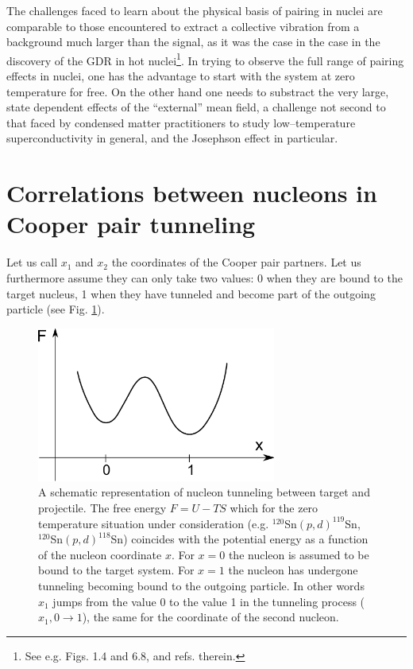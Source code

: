 The challenges faced to learn about the physical basis of pairing in nuclei are comparable to those encountered to extract a   collective vibration from a background much larger than the signal, as it was the case in the case in the discovery of the GDR in hot nuclei\footnote{See e.g. \cite{Bortignon:98} Figs. 1.4 and 6.8, and refs. therein.}. In trying to observe the full range of pairing effects in nuclei, one has the advantage to start with the system at zero temperature for free. On the other hand one needs to substract the very large, state dependent effects of the ``external'' mean field, a challenge not second to that faced by condensed matter practitioners to study low--temperature superconductivity in general, and the Josephson effect in particular.  


\section[Correlations in Cooper pair tunneling]{Correlations between nucleons in Cooper pair tunneling}\label{C3S3}
Let us call $x_1$ and $x_2$ the coordinates of the Cooper pair partners. Let us furthermore assume they can only take two values: 0 when they are bound to the target nucleus, 1 when they have tunneled and become part of the outgoing particle (see Fig. \ref{fig3.3.1}).
\begin{figure}
\centerline{\includegraphics*[width=0.7\textwidth,angle=0]{nutshell/figs/fig3_3_1.pdf}}
\caption{A schematic representation of nucleon tunneling between target and projectile. The free energy $F=U-TS$ which for the zero temperature situation under consideration (e.g. $^{120}$Sn$(p,d)^{119}$Sn, $^{120}$Sn$(p,d)^{118}$Sn) coincides with the potential energy as a function of the nucleon coordinate $x$. For $x=0$ the nucleon is assumed to be bound to the target system. For $x=1$ the nucleon has undergone tunneling becoming bound to the outgoing particle. In other words $x_1$ jumps from the value 0 to the value 1 in the tunneling process ($x_1, 0\rightarrow 1$), the same for the coordinate of the second nucleon.}\label{fig3.3.1}
\end{figure}


